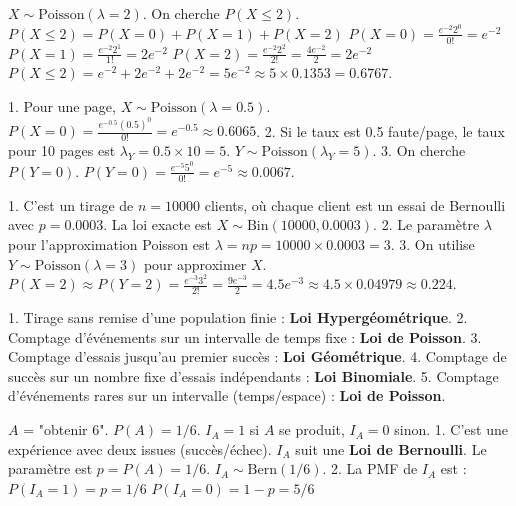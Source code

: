 \begin{correctionbox}
$X \sim \text{Poisson}(\lambda=2)$. On cherche $P(X \le 2)$.
$P(X \le 2) = P(X=0) + P(X=1) + P(X=2)$
$P(X=0) = \frac{e^{-2} 2^0}{0!} = e^{-2}$
$P(X=1) = \frac{e^{-2} 2^1}{1!} = 2e^{-2}$
$P(X=2) = \frac{e^{-2} 2^2}{2!} = \frac{4e^{-2}}{2} = 2e^{-2}$
$P(X \le 2) = e^{-2} + 2e^{-2} + 2e^{-2} = 5e^{-2} \approx 5 \times 0.1353 = 0.6767$.
\end{correctionbox}

\begin{correctionbox}
1.  Pour une page, $X \sim \text{Poisson}(\lambda=0.5)$.
    $P(X=0) = \frac{e^{-0.5} (0.5)^0}{0!} = e^{-0.5} \approx 0.6065$.
2.  Si le taux est 0.5 faute/page, le taux pour 10 pages est $\lambda_Y = 0.5 \times 10 = 5$.
    $Y \sim \text{Poisson}(\lambda_Y=5)$.
3.  On cherche $P(Y=0)$.
    $P(Y=0) = \frac{e^{-5} 5^0}{0!} = e^{-5} \approx 0.0067$.
\end{correctionbox}

\begin{correctionbox}
1.  C'est un tirage de $n=10000$ clients, où chaque client est un essai de Bernoulli avec $p=0.0003$. La loi exacte est $X \sim \text{Bin}(10000, 0.0003)$.
2.  Le paramètre $\lambda$ pour l'approximation Poisson est $\lambda = np = 10000 \times 0.0003 = 3$.
3.  On utilise $Y \sim \text{Poisson}(\lambda=3)$ pour approximer $X$.
    $P(X=2) \approx P(Y=2) = \frac{e^{-3} 3^2}{2!} = \frac{9e^{-3}}{2} = 4.5 e^{-3} \approx 4.5 \times 0.04979 \approx 0.224$.
\end{correctionbox}


\begin{correctionbox}
1.  Tirage sans remise d'une population finie : \textbf{Loi Hypergéométrique}.
2.  Comptage d'événements sur un intervalle de temps fixe : \textbf{Loi de Poisson}.
3.  Comptage d'essais jusqu'au premier succès : \textbf{Loi Géométrique}.
4.  Comptage de succès sur un nombre fixe d'essais indépendants : \textbf{Loi Binomiale}.
5.  Comptage d'événements rares sur un intervalle (temps/espace) : \textbf{Loi de Poisson}.
\end{correctionbox}

\begin{correctionbox}
$A$ = "obtenir 6". $P(A) = 1/6$.
$I_A = 1$ si $A$ se produit, $I_A = 0$ sinon.
1.  C'est une expérience avec deux issues (succès/échec). $I_A$ suit une \textbf{Loi de Bernoulli}.
    Le paramètre est $p = P(A) = 1/6$. $I_A \sim \text{Bern}(1/6)$.
2.  La PMF de $I_A$ est :
    $P(I_A = 1) = p = 1/6$
    $P(I_A = 0) = 1-p = 5/6$
\end{correctionbox}